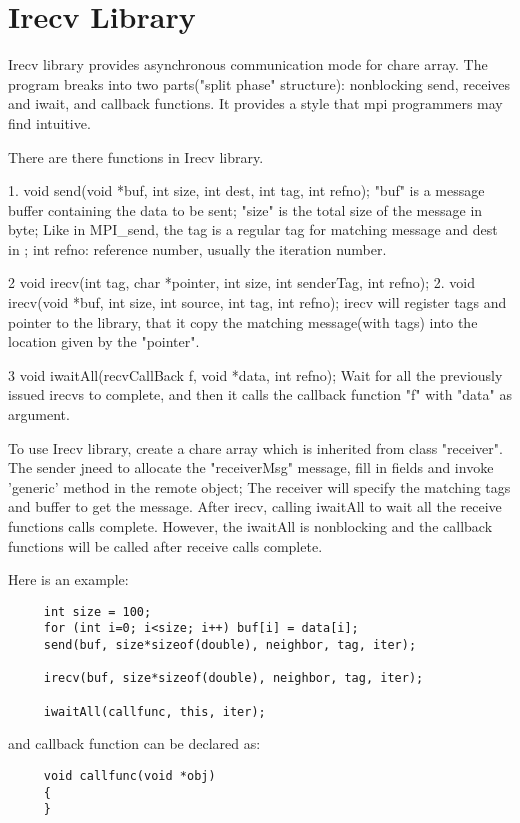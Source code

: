 \section{Irecv Library}

{\sc Irecv} library provides asynchronous communication mode for chare array. The program breaks into two parts("split phase" structure): nonblocking send, receives and iwait, and callback functions. It provides a style that mpi programmers may find intuitive. 

There are there functions in Irecv library.

1. void send(void *buf, int size, int dest, int tag, int refno);
"buf" is a message buffer containing the data to be sent; "size" is the total size of the message in byte; Like in MPI_send, the tag is a regular tag for matching message and dest in ;
int refno: reference number, usually the iteration number.
  

2 void irecv(int tag, char *pointer, int size, int senderTag, int refno);
2. void irecv(void *buf, int size, int source, int tag, int refno);
irecv will register tags and pointer to the library, that it copy the matching message(with tags) into the location given by the "pointer".

3 void iwaitAll(recvCallBack f, void *data, int refno);
Wait for all the previously issued irecvs to complete, and then it calls the callback function "f" with "data" as argument.

To use Irecv library, create a chare array which is inherited from class "receiver". The sender jneed to allocate the "receiverMsg" message, fill in fields and invoke 'generic' method in the remote object; The receiver will specify the matching tags and buffer to get the message. After irecv, calling iwaitAll to wait all the receive functions calls complete. However, the iwaitAll is nonblocking and the callback functions will be called after receive calls complete.

Here is an example:

\begin{verbatim}
     int size = 100;
     for (int i=0; i<size; i++) buf[i] = data[i];
     send(buf, size*sizeof(double), neighbor, tag, iter);

     irecv(buf, size*sizeof(double), neighbor, tag, iter);

     iwaitAll(callfunc, this, iter);
\end{verbatim}

and callback function can be declared as:

\begin{verbatim}
     void callfunc(void *obj)
     {
     }
\end{verbatim}
